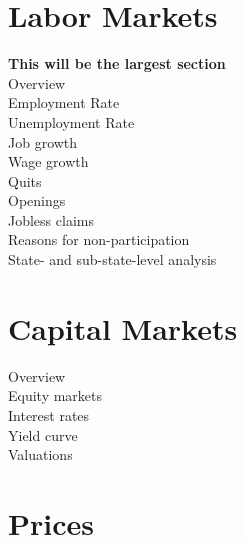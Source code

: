 \documentclass{report}
\begin{document}
{{{\begin{minipage}{0.76\textwidth}
\end{minipage}

\newpage

\section*{\color{darkgray}\LARGE \seriffont Labor Markets}

\normalsize

\textbf{This will be the largest section} \\

Overview \\

Employment Rate \\

Unemployment Rate \\

Job growth \\

Wage growth \\

Quits \\ 

Openings \\

Jobless claims \\

Reasons for non-participation \\

State- and sub-state-level analysis \\



\newpage

\section*{\color{darkgray}\LARGE \seriffont Capital Markets}

\normalsize

Overview \\

Equity markets \\

Interest rates \\

Yield curve \\

Valuations \\

\newpage

\section*{\color{darkgray}\LARGE \seriffont Prices}

}}}
\end{document}
